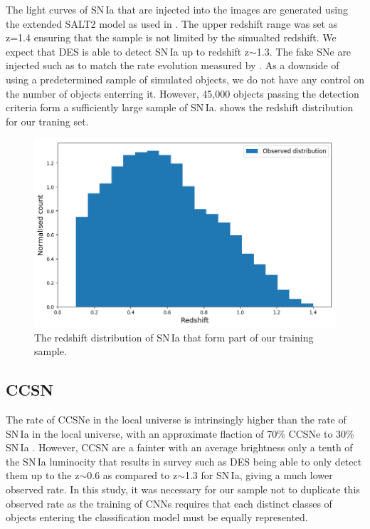 The light curves of SN\,Ia that are injected into the images are generated using the extended SALT2 model as used in \citet{Betoule2014}. The upper redshift range was set as z=1.4 ensuring that the sample is not limited by the simualted redshift. We expect that DES is able to detect SN\,Ia up to redshift z$\sim$1.3. The fake SNe are injected such as to match the rate evolution measured by \citet{Perrett2012}. As a downside of using a predetermined sample of simulated objects, we do not have any control on the number of objects enterring it. However, 45,000 objects passing the detection criteria form a sufficiently large sample of SN\,Ia.  shows the redshift distribution for our traning set.

\begin{figure}
  \includegraphics[width=\textwidth]{Figures/Chapter5/SNIa_z_dist.png}
  \caption{The redshift distribution of SN\,Ia that form part of our training sample. }
  \label{fig:IaDist}
\end{figure}

\subsection{CCSN}
The rate of CCSNe in the local universe is intrinsingly higher than the rate of SN\,Ia in the local universe, with an approximate flaction of 70\% CCSNe to 30\% SN\,Ia  \citep{Alsabti2017}. However, CCSN are a fainter with an average brightness only a tenth of the SN\,Ia luminocity that results in survey such as DES being able to only detect them up to the z$\sim$0.6 as compared to z$\sim$1.3 for SN\,Ia, giving a much lower observed rate. In this study, it was necessary for our sample not to duplicate this observed rate as the training of CNNs requires that each distinct classes of objects entering the classification model must be equally represented.

